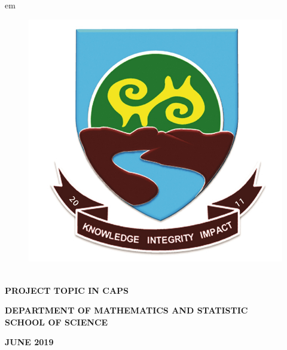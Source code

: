 \documentclass[12pt,a4paper]{book}
\begin{document}
	\pagestyle{plain}
	 em
	\begin{titlepage}
		\begin{center}
			
			\begin{figure}[h]
				\begin{center}
					\includegraphics[width=0.30\linewidth, height=.20\textheight]{images/logo2}
				\end{center}
			\end{figure}
			
			{}\\
			\vspace{1.7cm}
			{\normalfont \textbf{PROJECT TOPIC IN CAPS}}
			
			
			\vspace{2.7cm}
			
			{}
			\vspace{1.7cm}
			
			
			\begin{center}
				{\normalfont \textbf{DEPARTMENT OF MATHEMATICS AND STATISTIC}\\
					\textbf{SCHOOL OF SCIENCE}}\\
				\vspace{5.3cm}
				
				
				{\normalfont \textbf{JUNE 2019}}
			\end{center}
			
		\end{center}
		
		\vfill
	\end{titlepage}
\end{document}

